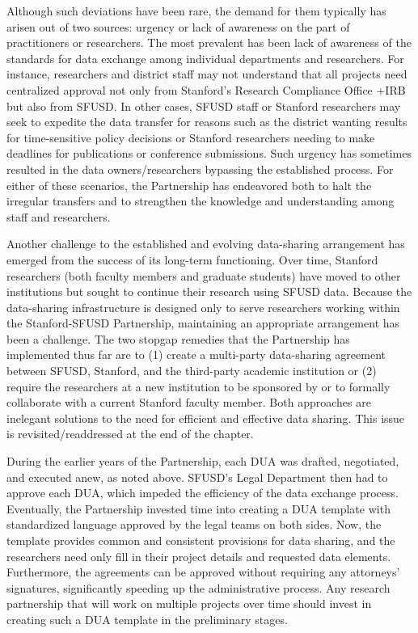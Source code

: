 \documentclass[
]{WileySix}
\begin{document}
Although such deviations have been rare, the demand for them typically has arisen out of two sources: urgency or lack of awareness on the part of practitioners or researchers. The most prevalent has been lack of awareness of the standards for data exchange among individual departments and researchers. For instance, researchers and district staff may not understand that all projects need centralized approval not only from Stanford's Research Compliance Office +IRB\textbar{} but also from SFUSD. In other cases, SFUSD staff or Stanford researchers may seek to expedite the data transfer for reasons such as the district wanting results for time-sensitive policy decisions or Stanford researchers needing to make deadlines for publications or conference submissions. Such urgency has sometimes resulted in the data owners/researchers bypassing the established process. For either of these scenarios, the Partnership has endeavored both to halt the irregular transfers and to strengthen the knowledge and understanding among staff and researchers.

Another challenge to the established and evolving data-sharing arrangement has emerged from the success of its long-term functioning. Over time, Stanford researchers (both faculty members and graduate students) have moved to other institutions but sought to continue their research using SFUSD data. Because the data-sharing infrastructure is designed only to serve researchers working within the Stanford-SFUSD Partnership, maintaining an appropriate arrangement has been a challenge. The two stopgap remedies that the Partnership has implemented thus far are to (1) create a multi-party data-sharing agreement between SFUSD, Stanford, and the third-party academic institution or (2) require the researchers at a new institution to be sponsored by or to formally collaborate with a current Stanford faculty member. Both approaches are inelegant solutions to the need for efficient and effective data sharing. This issue is revisited/readdressed at the end of the chapter.

During the earlier years of the Partnership, each DUA was drafted, negotiated, and executed anew, as noted above. SFUSD's Legal Department then had to approve each DUA, which impeded the efficiency of the data exchange process. Eventually, the Partnership invested time into creating a DUA template with standardized language approved by the legal teams on both sides. Now, the template provides common and consistent provisions for data sharing, and the researchers need only fill in their project details and requested data elements. Furthermore, the agreements can be approved without requiring any attorneys' signatures, significantly speeding up the administrative process. Any research partnership that will work on multiple projects over time should invest in creating such a DUA template in the preliminary stages.
\end{document}

